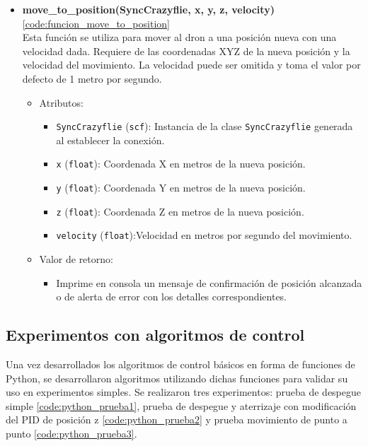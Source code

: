 \begin{itemize}
	\item \textbf{move\_to\_position(SyncCrazyflie, x, y, z, velocity)} \ref{code:funcion_move_to_position}\\ 
	Esta función se utiliza para mover al dron a una posición nueva con una velocidad dada. Requiere de las coordenadas XYZ de la nueva posición y la velocidad del movimiento. La velocidad puede ser omitida y toma el valor por defecto de 1 metro por segundo. 
	\begin{itemize}
		\item Atributos:
		\begin{itemize}
			\item \texttt{SyncCrazyflie} (\texttt{scf}): Instancia de la clase \texttt{SyncCrazyflie} generada al establecer la conexión.
			\item \texttt{x} (\texttt{float}): Coordenada X en metros de la nueva posición.
			\item \texttt{y} (\texttt{float}): Coordenada Y en metros de la nueva posición.
			\item \texttt{z} (\texttt{float}): Coordenada Z en metros de la nueva posición.
			\item \texttt{velocity} (\texttt{float}):Velocidad en metros por segundo del movimiento.
		\end{itemize}
		\item Valor de retorno:
		\begin{itemize}
			\item Imprime en consola un mensaje de confirmación de posición alcanzada o de alerta de error con los detalles correspondientes.
		\end{itemize}
	\end{itemize} 
\end{itemize}

\subsection{Experimentos con algoritmos de control}
Una vez desarrollados los algoritmos de control básicos en forma de funciones de Python, se desarrollaron algoritmos utilizando dichas funciones para validar su uso en experimentos simples. Se realizaron tres experimentos: prueba de despegue simple \ref{code:python_prueba1}, prueba de despegue y aterrizaje con modificación del PID de posición z \ref{code:python_prueba2} y prueba movimiento de punto a punto \ref{code:python_prueba3}.

